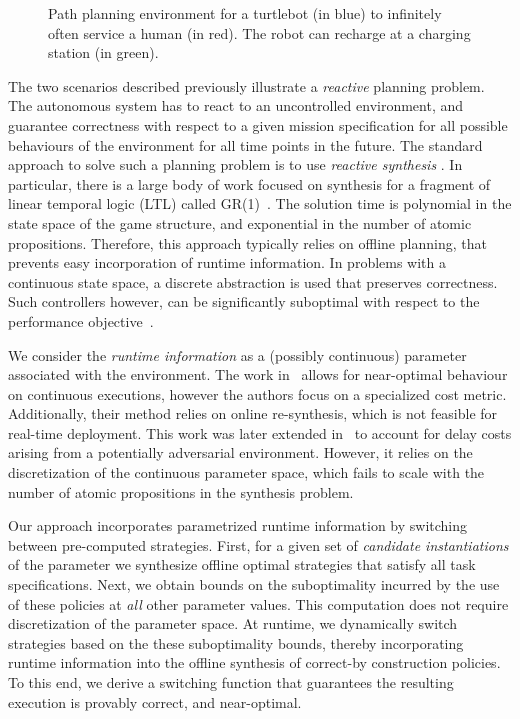 \begin{figure}
    
    \caption{Path planning environment for a turtlebot (in blue) to infinitely often service a human (in red). The robot can recharge at a charging station (in green).}
    \label{fig:gazeboworld}
    \vspace{-0.5cm}
\end{figure}

The two scenarios described previously illustrate a \emph{reactive} planning problem. The autonomous system has to react to an uncontrolled environment, and guarantee correctness with respect to a given mission specification for all possible behaviours of the environment for all time points in the future. The standard approach to solve such a planning problem is to use \emph{reactive synthesis} \cite{piterman2006,bloem2012}. In particular, there is a large body of work focused on synthesis for a fragment of linear temporal logic (LTL) called GR(1)~\cite{Ehlerslugs,bh18,Alonso18,Moarref18}. The solution time is polynomial in the state space of the game structure, and exponential in the number of atomic propositions. Therefore, this approach typically relies on offline planning, that prevents easy incorporation of runtime information. In problems with a continuous state space, a discrete abstraction is used that preserves correctness. Such controllers however, can be significantly suboptimal with respect to the performance objective~\cite{jangcontinuous}. 

We consider the \emph{runtime information} as a (possibly continuous) parameter associated with the environment. The work in~\cite{jangcontinuous} allows for near-optimal behaviour on continuous executions, however the authors focus on a specialized cost metric. Additionally, their method relies on online re-synthesis, which is not feasible for real-time deployment. This work was later extended in~\cite{Ehlerscost} to account for delay costs arising from a potentially adversarial environment. However, it relies on the discretization of the continuous parameter space, which fails to scale with the number of atomic propositions in the synthesis problem. 

Our approach incorporates parametrized runtime information by switching between pre-computed strategies. First, for a given set of \emph{candidate instantiations} of the parameter we synthesize offline optimal strategies that satisfy all task specifications. Next, we obtain bounds on the suboptimality incurred by the use of these policies at \emph{all} other parameter values. This computation does not require discretization of the parameter space. At runtime, we dynamically switch strategies based on the these suboptimality bounds, thereby incorporating runtime information into the offline synthesis of correct-by construction policies. 
To this end, we derive a switching function that guarantees the resulting execution is provably correct, and near-optimal.

